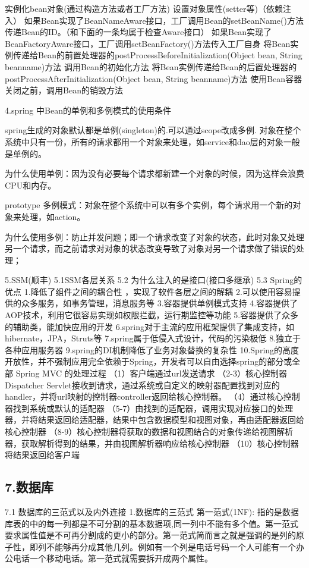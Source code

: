 \documentclass[UTF8]{ctexart}
\begin{document}
实例化bean对象(通过构造方法或者工厂方法)
设置对象属性(setter等)（依赖注入）
如果Bean实现了BeanNameAware接口，工厂调用Bean的setBeanName()方法传递Bean的ID。（和下面的一条均属于检查Aware接口）
如果Bean实现了BeanFactoryAware接口，工厂调用setBeanFactory()方法传入工厂自身
将Bean实例传递给Bean的前置处理器的postProcessBeforeInitialization(Object bean, String beanname)方法
调用Bean的初始化方法
将Bean实例传递给Bean的后置处理器的postProcessAfterInitialization(Object bean, String beanname)方法
使用Bean容器关闭之前，调用Bean的销毁方法


4.spring 中Bean的单例和多例模式的使用条件

spring生成的对象默认都是单例(singleton)的.可以通过scope改成多例. 对象在整个系统中只有一份，所有的请求都用一个对象来处理，如service和dao层的对象一般是单例的。

为什么使用单例：因为没有必要每个请求都新建一个对象的时候，因为这样会浪费CPU和内存。

prototype 多例模式：对象在整个系统中可以有多个实例，每个请求用一个新的对象来处理，如action。

为什么使用多例：防止并发问题；即一个请求改变了对象的状态，此时对象又处理另一个请求，而之前请求对对象的状态改变导致了对象对另一个请求做了错误的处理；

5.SSM(顺丰)
5.1SSM各层关系
5.2 为什么注入的是接口(接口多继承)
5.3 Spring的优点
1.降低了组件之间的耦合性 ，实现了软件各层之间的解耦
2.可以使用容易提供的众多服务，如事务管理，消息服务等
3.容器提供单例模式支持
4.容器提供了AOP技术，利用它很容易实现如权限拦截，运行期监控等功能
5.容器提供了众多的辅助类，能加快应用的开发
6.spring对于主流的应用框架提供了集成支持，如hibernate，JPA，Struts等
7.spring属于低侵入式设计，代码的污染极低
8.独立于各种应用服务器
9.spring的DI机制降低了业务对象替换的复杂性
10.Spring的高度开放性，并不强制应用完全依赖于Spring，开发者可以自由选择spring的部分或全部
Spring MVC 的处理过程
（1）客户端通过url发送请求
（2-3）核心控制器Dispatcher Servlet接收到请求，通过系统或自定义的映射器配置找到对应的handler，并将url映射的控制器controller返回给核心控制器。
（4）通过核心控制器找到系统或默认的适配器
（5-7）由找到的适配器，调用实现对应接口的处理器，并将结果返回给适配器，结果中包含数据模型和视图对象，再由适配器返回给核心控制器
（8-9）核心控制器将获取的数据和视图结合的对象传递给视图解析器，获取解析得到的结果，并由视图解析器响应给核心控制器
（10）核心控制器将结果返回给客户端
\subsection{7.数据库}
7.1 数据库的三范式以及内外连接
1.数据库的三范式
第一范式(1NF):
指的是数据库表的中的每一列都是不可分割的基本数据项,同一列中不能有多个值。第一范式要求属性值是不可再分割成的更小的部分。第一范式简而言之就是强调的是列的原子性，即列不能够再分成其他几列。例如有一个列是电话号码一个人可能有一个办公电话一个移动电话。第一范式就需要拆开成两个属性。
\end{document}
